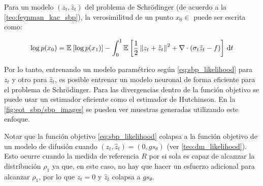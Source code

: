 \begin{teo}
	\label{teo:sbp_likelihood}
	Para un modelo $(z_t,\hat z_t)$ del problema de Schrödinger (de acuerdo a la \autoref{teo:feynman_kac_sbp}), la verosimilitud de un punto $x_0\in\xspace$ puede ser escrita como:

\begin{equation}
	\label{eq:sbp_likelihood}
	\log p(x_0) = \mathbb{E}_{}\left[\log p(x_1)\right] - \int_0^1 \mathbb{E}_{}\left[\frac{1}{2}\left\lVert z_t + \hat z_t \right\rVert^2 + \nabla\cdot\left(\sigma_t \hat z_t - f\right)\right] \,\operatorname{d}\! t
\end{equation}

\end{teo}

Por lo tanto, entrenando un modelo paramétrico según \eqref{eq:sbp_likelihood} para $z_t$ y otro para $\hat z_t$, es posible entrenar un modelo neuronal de forma eficiente para el problema de Schrödinger. Para las divergencias dentro de la función objetivo se puede usar un estimador eficiente como el estimador de Hutchinson. En la \autoref{fig:eot_sbp/sbp_images} se pueden ver muestras generadas utilizando este enfoque.

Notar que la función objetivo \eqref{eq:sbp_likelihood} colapsa a la función objetivo de un modelo de difusión cuando $(z_t,\hat z_t)=(0,gs_\theta)$ (ver \autoref{teo:dm_likelihood}). Esto ocurre cuando la medida de referencia $R$ por si sola es capaz de alcanzar la distribución $\rho_1$ ya que, en este caso, no hay que hacer un esfuerzo adicional para alcanzar $\rho_1$, por lo que $z_t=0$ y $\hat z_t$ colapsa a $gs_\theta$.

